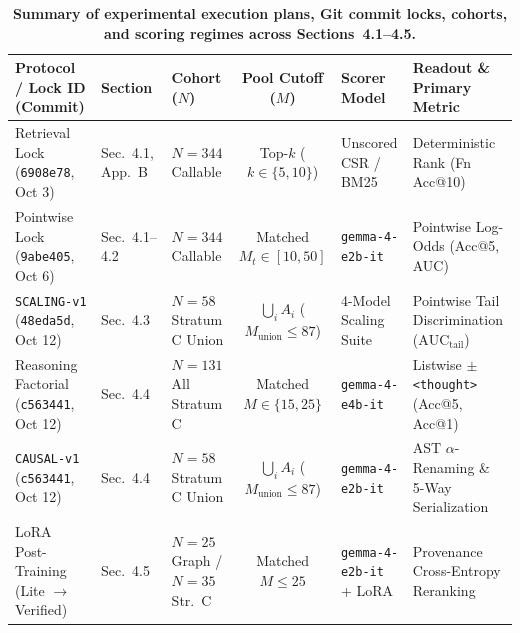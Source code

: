 \documentclass[10pt]{article}
\begin{document}
\begin{table}[!t]
\centering
\caption{\textbf{Summary of experimental execution plans, Git commit locks, cohorts, and scoring regimes across Sections~4.1--4.5.}}
\label{tab:protocol_roadmap}
\scriptsize
\setlength{\tabcolsep}{2.5pt}
\begin{tabular}{>{\raggedright\arraybackslash}p{3.1cm} l l c l >{\raggedright\arraybackslash}p{3.1cm}}
\toprule
\textbf{Protocol / Lock ID (Commit)} & \textbf{Section} & \textbf{Cohort ($N$)} & \textbf{Pool Cutoff ($M$)} & \textbf{Scorer Model} & \textbf{Readout \& Primary Metric} \\
\midrule
Retrieval Lock (\texttt{6908e78}, Oct 3) & Sec.~4.1, App.~B & $N=344$ Callable & Top-$k$ ($k \in \{5,10\}$) & Unscored CSR / BM25 & Deterministic Rank (Fn Acc@10) \\
Pointwise Lock (\texttt{9abe405}, Oct 6) & Sec.~4.1--4.2 & $N=344$ Callable & Matched $M_t \in [10,50]$ & \texttt{gemma-4-e2b-it} & Pointwise Log-Odds (Acc@5, AUC) \\
\texttt{SCALING-v1} (\texttt{48eda5d}, Oct 12) & Sec.~4.3 & $N=58$ Stratum C Union & $\bigcup_i A_i$ ($M_{\text{union}} \le 87$) & 4-Model Scaling Suite & Pointwise Tail Discrimination ($\text{AUC}_{\text{tail}}$) \\
Reasoning Factorial (\texttt{c563441}, Oct 12) & Sec.~4.4 & $N=131$ All Stratum C & Matched $M \in \{15, 25\}$ & \texttt{gemma-4-e4b-it} & Listwise $\pm$ \texttt{<thought>} (Acc@5, Acc@1) \\
\texttt{CAUSAL-v1} (\texttt{c563441}, Oct 12) & Sec.~4.4 & $N=58$ Stratum C Union & $\bigcup_i A_i$ ($M_{\text{union}} \le 87$) & \texttt{gemma-4-e2b-it} & AST $\alpha$-Renaming \& 5-Way Serialization \\
LoRA Post-Training (Lite $\to$ Verified) & Sec.~4.5 & $N=25$ Graph / $N=35$ Str.\ C & Matched $M \le 25$ & \texttt{gemma-4-e2b-it} + LoRA & Provenance Cross-Entropy Reranking \\
\bottomrule
\end{tabular}
\end{table}
\end{document}
